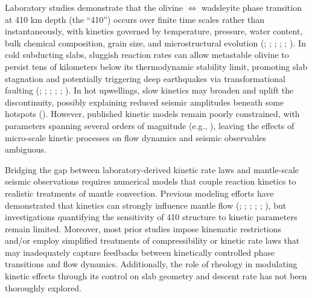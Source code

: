 \documentclass[
  paper=a4,
  ,captions=tableheading
]{scrartcl}
\begin{document}
Laboratory studies demonstrate that the olivine \(\Leftrightarrow\)
wadsleyite phase transition at 410 km depth (the ``410'') occurs over
finite time scales rather than instantaneously, with kinetics governed
by temperature, pressure, water content, bulk chemical composition,
grain size, and microstructural evolution
(;
;
;
;
;
). In cold subducting
slabs, sluggish reaction rates can allow metastable olivine to persist
tens of kilometers below its thermodynamic stability limit, promoting
slab stagnation and potentially triggering deep earthquakes via
transformational faulting (; ;
;
;
;
). In hot
upwellings, slow kinetics may broaden and uplift the discontinuity,
possibly explaining reduced seismic amplitudes beneath some hotspots
(). However, published
kinetic models remain poorly constrained, with parameters spanning
several orders of magnitude (e.g., ), leaving the effects of micro-scale kinetic processes on
flow dynamics and seismic observables ambiguous.

Bridging the gap between laboratory-derived kinetic rate laws and
mantle-scale seismic observations requires numerical models that couple
reaction kinetics to realistic treatments of mantle convection. Previous
modeling efforts have demonstrated that kinetics can strongly influence
mantle flow (;
;
;
;
;
), but
investigations quantifying the sensitivity of 410 structure to kinetic
parameters remain limited. Moreover, most prior studies impose kinematic
restrictions and/or employ simplified treatments of compressibility or
kinetic rate laws that may inadequately capture feedbacks between
kinetically controlled phase transitions and flow dynamics.
Additionally, the role of rheology in modulating kinetic effects through
its control on slab geometry and descent rate has not been thoroughly
explored.
\end{document}
